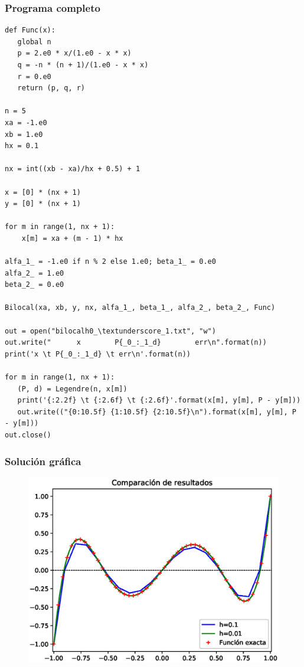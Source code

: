 \begin{frame}
\frametitle{Programa completo}
\begin{lstlisting}[caption=Programa completo, style=FormattedNumber, basicstyle=\linespread{1.1}\ttfamily=\small, columns=fullflexible]
def Func(x):
   global n
   p = 2.e0 * x/(1.e0 - x * x)
   q = -n * (n + 1)/(1.e0 - x * x)
   r = 0.e0
   return (p, q, r)

n = 5
xa = -1.e0
xb = 1.e0
hx = 0.1

nx = int((xb - xa)/hx + 0.5) + 1

x = [0] * (nx + 1)
y = [0] * (nx + 1)

for m in range(1, nx + 1):
    x[m] = xa + (m - 1) * hx

alfa_1_ = -1.e0 if n % 2 else 1.e0; beta_1_ = 0.e0
alfa_2_ = 1.e0
beta_2_ = 0.e0

Bilocal(xa, xb, y, nx, alfa_1_, beta_1_, alfa_2_, beta_2_, Func)

out = open("bilocalh0_\textunderscore_1.txt", "w")
out.write("      x        P{_0_:_1_d}        err\n".format(n))
print('x \t P{_0_:_1_d} \t err\n'.format(n))

for m in range(1, nx + 1):
   (P, d) = Legendre(n, x[m])
   print('{:2.2f} \t {:2.6f} \t {:2.6f}'.format(x[m], y[m], P - y[m]))
   out.write(("{0:10.5f} {1:10.5f} {2:10.5f}\n").format(x[m], y[m], P - y[m]))
out.close()
\end{lstlisting}
\end{frame}
\begin{frame}[plain]
\frametitle{Solución gráfica}
\begin{figure}
	\centering
	\includegraphics[scale=0.6]{Imagenes/ejercicio_Legendre_01.eps}
\end{figure}
\end{frame}
